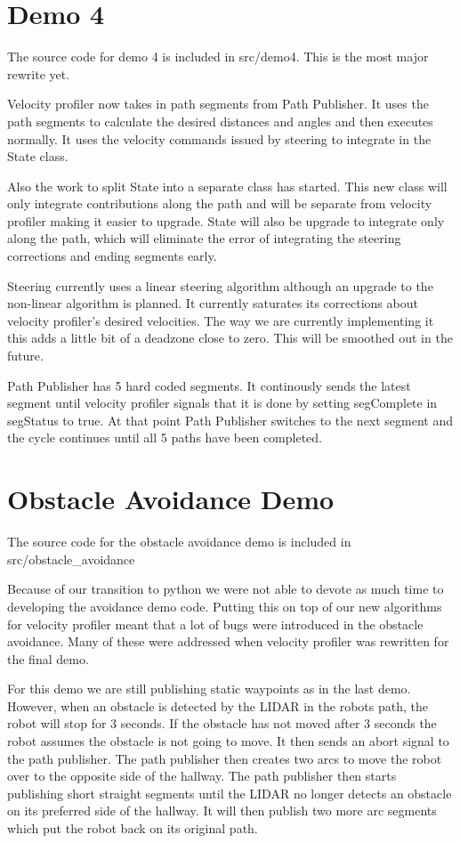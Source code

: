 \section{Demo 4}
The source code for demo 4 is included in src/demo4.  This is the most
major rewrite yet.

Velocity profiler now takes in path segments from Path Publisher.  It
uses the path segments to calculate the desired distances and angles
and then executes normally. It uses the velocity commands issued by
steering to integrate in the State class.

Also the work to split State into a separate class has started.  This
new class will only integrate contributions along the path and will be
separate from velocity profiler making it easier to upgrade.  State
will also be upgrade to integrate only along the path, which will
eliminate the error of integrating the steering corrections and ending
segments early.

Steering currently uses a linear steering algorithm although an
upgrade to the non-linear algorithm is planned.  It currently
saturates its corrections about velocity profiler's desired
velocities.  The way we are currently implementing it this adds a
little bit of a deadzone close to zero.  This will be smoothed out in
the future.

Path Publisher has 5 hard coded segments.  It continously sends the
latest segment until velocity profiler signals that it is done by
setting segComplete in segStatus to true.  At that point Path
Publisher switches to the next segment and the cycle continues until
all 5 paths have been completed.


\section{Obstacle Avoidance Demo}
The source code for the obstacle avoidance demo is included in src/obstacle\_avoidance

Because of our transition to python we were not able to devote as much time to developing the avoidance demo code. Putting this on top of our new algorithms for velocity profiler meant that a lot of bugs were introduced in the obstacle avoidance. Many of these were addressed when velocity profiler was rewritten for the final demo.

For this demo we are still publishing static waypoints as in the last demo. However, when an obstacle is detected by the LIDAR in the robots path, the robot will stop for 3 seconds. If the obstacle has not moved after 3 seconds the robot assumes the obstacle is not going to move. It then sends an abort signal to the path publisher. The path publisher then creates two arcs to move the robot over to the opposite side of the hallway.  The path publisher then starts publishing short straight segments until the LIDAR no longer detects an obstacle on its preferred side of the hallway. It will then publish two more arc segments which put the robot back on its original path.

